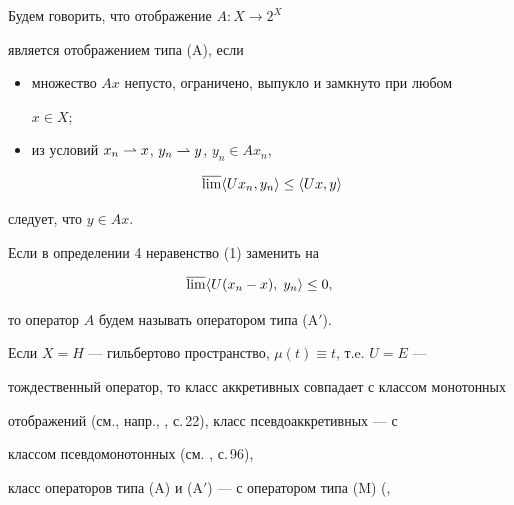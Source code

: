  


\begin{defn} Будем говорить, что отображение $A:X\to 2^X$ 


является отображением типа (A), если 


\begin{itemize} 


\item[1)] множество $Ax$ непусто, ограничено, выпукло и замкнуто при любом 


$x\in X$; 


\item[2)] из условий $x_n\rightharpoonup x$, $y_n\rightharpoonup y$, $y_n\in Ax_n$, 


\begin{equation} 


\overline{\lim}\la Ux_n,y_n\ra\le \la Ux,y\ra 


\end{equation} 


\end{itemize} 


\noindent следует, что $y\in Ax$. 


\end{defn} 


 


\begin{defn} Если в определении 4 неравенство (1) заменить на 


\begin{equation} 


\overline{\lim}\la U(x_n-x),\;y_n\ra \le 0, 


\end{equation} 


то оператор $A$ будем называть оператором типа (A$'$). 


\end{defn} 


 


Если $X=H$ --- гильбертово пространство, $\mu(t)\equiv t$, т.e. $U=E$ --- 


тождественный оператор, то класс аккретивных совпадает с классом монотонных 


отображений (см., напр., \cite{Vai}, с.\,22), класс псевдоаккретивных --- с 


классом псевдомонотонных (см. \cite{Pas}, с.\,96), 


класс операторов типа (A) и (A$'$) --- с оператором типа (M) (\cite{Pas}, 


